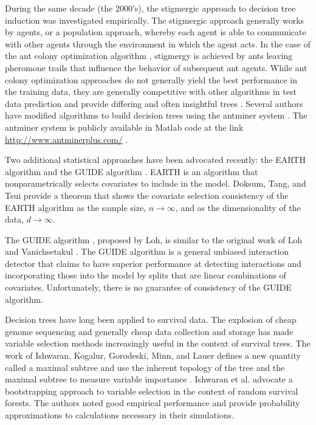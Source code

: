 During the same decade (the 2000's), the stigmergic approach to decision tree induction was investigated empirically. The stigmergic approach generally works by agents, or a population approach, whereby each agent is able to communicate with other agents through the environment in which the agent acts. In the case of the ant colony optimization algorithm \cite{dorigo2004ant}, stigmergy is achieved by ants leaving pheromone trails that influence the behavior of subsequent ant agents. While ant colony optimization approaches do not generally yield the best performance in the training data, they are generally competitive with other algorithms in test data prediction and provide differing and often insightful trees \cite{dorigo2006ant}. Several authors have modified algorithms to build decision trees using the antminer system \cite{parpinelli2002data} \cite{liu2003classification}. The antminer system is publicly available in Matlab code at the link \href{http://www.antminerplus.com/}{http://www.antminerplus.com/} .   

Two additional statistical approaches have been advocated recently: the EARTH algorithm and the GUIDE algorithm \cite{doksum2008nonparametric} \cite{guide}. EARTH is an algorithm that nonparametrically selects covariates to include in the model. Doksum, Tang, and Tsui \cite{doksum2008nonparametric} provide a theorem that shows the covariate selection consistency of the EARTH algorithm as the sample size, $n\to\infty$, and as the dimensionality of the data, $d\to\infty$. %

The GUIDE algorithm \cite{guide}, proposed by Loh, is similar to the original work of Loh and Vanichsetakul \cite{loh1988tree}. The GUIDE algorithm is a general unbiased interaction detector that claims to have superior performance at detecting interactions and incorporating those into the model by splits that are linear combinations of covariates.  Unfortunately, there is no guarantee of consistency of the GUIDE algorithm.


Decision trees have long been applied to survival data. The explosion of cheap genome sequencing and generally cheap data collection and storage has made variable selection methods increasingly useful in the context of survival trees. The work of Ishwaran, Kogalur, Gorodeski, Minn, and Lauer defines a new quantity called a maximal subtree and use the inherent topology of the tree and the maximal subtree to measure variable importance  \cite{ishwaran2010high}. Ishwaran et al. advocate a bootstrapping approach to variable selection in the context of random survival forests. The authors noted good empirical performance and provide probability approximations to calculations necessary in their simulations. 


